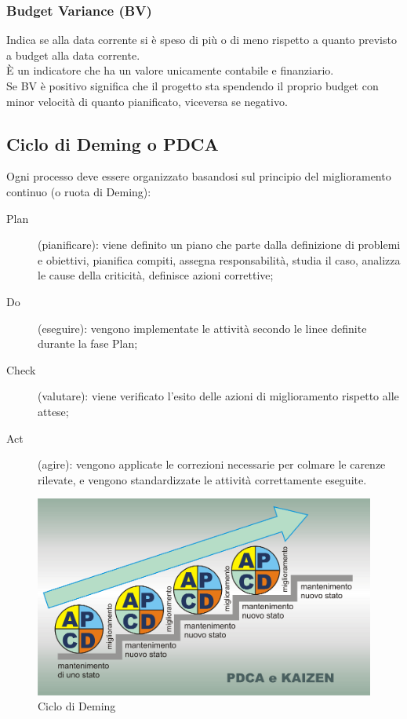 \documentclass[PianoDiQualifica.tex]{subfiles}
\begin{document}
\subsection{Budget Variance (BV)}
Indica se alla data corrente si è speso di più o di meno rispetto a quanto previsto a budget alla data corrente.\\
È un indicatore che ha un valore unicamente contabile e finanziario.\\
Se BV è positivo significa che il progetto sta spendendo il proprio budget con minor velocità di quanto pianificato, viceversa se negativo.


\begin{appendices}

\chapter{Ciclo di Deming o PDCA}
Ogni processo deve essere organizzato basandosi sul principio del miglioramento continuo (o ruota di Deming):
\begin{description}
	\item [Plan] (pianificare): viene definito un piano che parte dalla definizione di problemi e obiettivi, pianifica compiti, assegna responsabilità, studia il caso, analizza le cause della criticità, definisce azioni correttive; 
	\item [Do](eseguire): vengono implementate le attività secondo le linee definite durante la fase Plan;
	\item [Check] (valutare): viene verificato l'esito delle azioni di miglioramento rispetto alle attese;
	\item [Act] (agire): vengono applicate le correzioni necessarie per colmare le carenze rilevate, e vengono standardizzate le attività correttamente eseguite.
\end{description}

\begin{figure}[htbp]
	\begin{center}
		\includegraphics[width=0.7\linewidth]{../../common/images/PDCAkaizen}
		\caption[Ciclo di Deming]{Ciclo di Deming}
		\label{fig:pdca}
	\end{center}
\end{figure}


\end{appendices}
\end{document}
